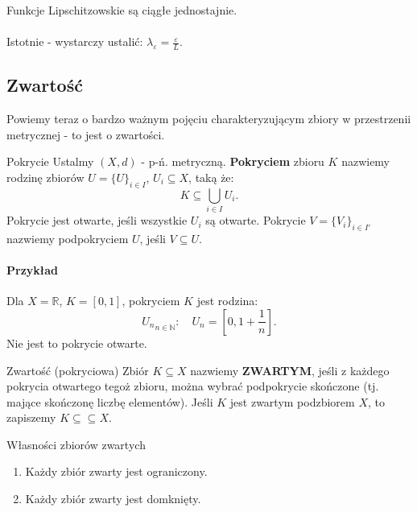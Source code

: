 \documentclass{article}
\numberwithin{defi}{section}
\numberwithin{defi}{section}
\newcommand{\R}{\mathbb{R}}
\newcommand{\N}{\mathbb{N}}
\providecommand{\eps}{\varepsilon}
\begin{document}
    \begin{obs}{}
        Funkcje Lipschitzowskie są ciągłe jednostajnie.
    \end{obs}
    \paragraph{} Istotnie - wystarczy ustalić: $\lambda_\eps = \frac{\eps}{L}$.

\subsection{Zwartość}

    Powiemy teraz o bardzo ważnym pojęciu charakteryzującym zbiory w przestrzenii metrycznej - to jest o zwartości.

    \begin{defr}{Pokrycie}
        Ustalmy $(X, d)$ - p-ń. metryczną.
        \textbf{Pokryciem} zbioru $K$ nazwiemy rodzinę zbiorów $U = \{U \}_{i \in I}$, $U_i \subseteq X$, taką że: \begin{equation}
            K \subseteq \bigcup_{i \in I} U_i.
        \end{equation}  Pokrycie jest otwarte, jeśli wszystkie $U_i$ są otwarte.
        Pokrycie $V = \{ V_i \}_{i \in I'}$ nazwiemy podpokryciem $U$, jeśli $V \subseteq U$.
    \end{defr}
    \paragraph{Przykład} Dla $X = \R$, $K = [0, 1]$, pokryciem $K$ jest rodzina: \begin{equation*}
        {U_n}_{n \in \N}: \quad U_n = [0, 1 + \frac{1}{n}].
    \end{equation*} Nie jest to pokrycie otwarte.

    \begin{defr}{Zwartość (pokryciowa)}\label{defr:zwartosc-pokryciowa}
        Zbiór $K \subseteq X$ nazwiemy \textbf{ZWARTYM}, jeśli z każdego pokrycia otwartego tegoż zbioru, można wybrać podpokrycie skończone (tj. mające skończonę liczbę elementów). Jeśli $K$ jest zwartym podzbiorem $X$, to zapiszemy $K \subseteq \subseteq X$.
    \end{defr}


    \begin{twier}{Własności zbiorów zwartych} \label{twier:zwar-domk}
        \begin{enumerate}
            \item Każdy zbiór zwarty jest ograniczony.
            \item Każdy zbiór zwarty jest domknięty.
        \end{enumerate}
    \end{twier}
\end{document}
